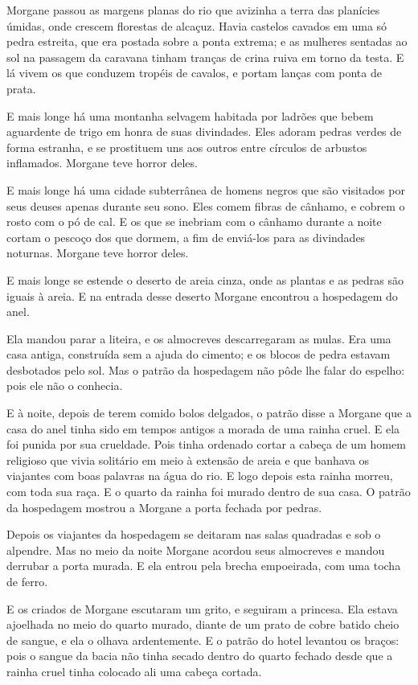 Morgane passou as margens planas do rio que avizinha a terra das
planícies úmidas, onde crescem florestas de alcaçuz. Havia castelos
cavados em uma só pedra estreita, que era postada sobre a ponta extrema; e
as mulheres sentadas ao sol na passagem da caravana tinham tranças de
crina ruiva em torno da testa. E lá vivem os que conduzem tropéis de
cavalos, e portam lanças com ponta de prata.

E mais longe há uma montanha selvagem habitada por ladrões que bebem
aguardente de trigo em honra de suas divindades. Eles adoram pedras verdes
de forma estranha, e se prostituem uns aos outros entre círculos de
arbustos inflamados. Morgane teve horror deles.

E mais longe há uma cidade subterrânea de homens negros que são
visitados por seus deuses apenas durante seu sono. Eles comem fibras de
cânhamo, e cobrem o rosto com o pó de cal. E os que se inebriam com o
cânhamo durante a noite cortam o pescoço dos que dormem, a fim de
enviá-los para as divindades noturnas. Morgane teve horror deles.

E mais longe se estende o deserto de areia cinza, onde as plantas e as
pedras são iguais à areia. E na entrada desse deserto Morgane encontrou a
hospedagem do anel.

Ela mandou parar a liteira, e os almocreves descarregaram as mulas. Era
uma casa antiga, construída sem a ajuda do cimento; e os blocos de pedra
estavam desbotados pelo sol. Mas o patrão da hospedagem não pôde lhe falar
do espelho: pois ele não o conhecia.

E à noite, depois de terem comido bolos delgados, o patrão disse a
Morgane que a casa do anel tinha sido em tempos antigos a morada de uma
rainha cruel. E ela foi punida por sua crueldade. Pois tinha ordenado
cortar a cabeça de um homem religioso que vivia solitário em meio à extensão
de areia e que banhava os viajantes com boas palavras na água do rio. E
logo depois esta rainha morreu, com toda sua raça. E o quarto da rainha
foi murado dentro de sua casa. O patrão da hospedagem mostrou a Morgane a
porta fechada por pedras.

Depois os viajantes da hospedagem se deitaram nas salas quadradas e sob
o alpendre. Mas no meio da noite Morgane acordou seus almocreves e mandou
derrubar a porta murada. E ela entrou pela brecha empoeirada, com uma
tocha de ferro.

E os criados de Morgane escutaram um grito, e seguiram a princesa. Ela
estava ajoelhada no meio do quarto murado, diante de um prato de cobre
batido cheio de sangue, e ela o olhava ardentemente. E o patrão do hotel
levantou os braços: pois o sangue da bacia não tinha secado dentro do
quarto fechado desde que a rainha cruel tinha colocado ali uma cabeça
cortada.

